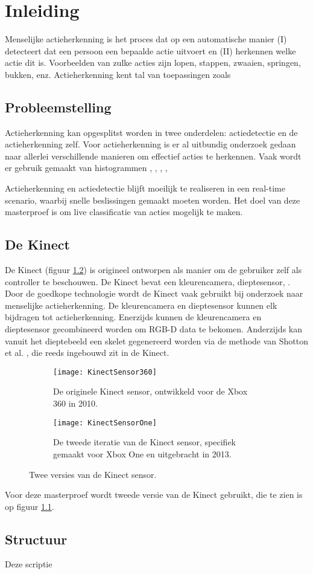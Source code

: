 \setcounter{page}{1}
\chapter{Inleiding}
\label{ch:Inleiding}
Menselijke actieherkenning is het proces dat op een automatische manier (I) detecteert dat een persoon een bepaalde actie uitvoert en (II) herkennen welke actie dit is. Voorbeelden van zulke acties zijn lopen, stappen, zwaaien, springen, bukken, enz. Actieherkenning kent tal van toepassingen zoals 




\section{Probleemstelling}
Actieherkenning kan opgesplitst worden in twee onderdelen: actiedetectie en de actieherkenning zelf. Voor actieherkenning is er al uitbundig onderzoek gedaan naar allerlei verschillende manieren om effectief acties te herkennen. Vaak wordt er gebruik gemaakt van histogrammen \cite{Xia2012},
\cite{Chen2017},
\cite{Vezzani2010},
\cite{Mendoza2007}, 


Actieherkenning en actiedetectie blijft moeilijk te realiseren in een real-time scenario, waarbij snelle beslissingen gemaakt moeten worden. Het doel van deze masterproef is om live classificatie van acties mogelijk te maken. 



\section{De Kinect}
De Kinect (figuur \ref{fig:KinectSensorVersies}) is origineel ontworpen als manier om de gebruiker zelf als controller te beschouwen. De Kinect bevat een kleurencamera, dieptesensor, . Door de goedkope technologie wordt de Kinect vaak gebruikt bij onderzoek naar menselijke actieherkenning. De kleurencamera en dieptesensor kunnen elk bijdragen tot actieherkenning. Enerzijds kunnen de kleurencamera en dieptesensor gecombineerd worden om RGB-D data te bekomen. Anderzijds kan vanuit het dieptebeeld een skelet gegenereerd worden via de methode van Shotton et al. \cite{Shotton2011}, die reeds ingebouwd zit in de Kinect.
\begin{figure}
	\begin{subfigure}[t]{0.48\textwidth}
		\texttt{[image: KinectSensor360]}
		\caption{De originele Kinect sensor, ontwikkeld voor de Xbox 360 in 2010.}
	\end{subfigure}
	\begin{subfigure}[t]{0.48\textwidth}
		\texttt{[image: KinectSensorOne]}
		\caption{De tweede iteratie van de Kinect sensor, specifiek gemaakt voor Xbox One en uitgebracht in 2013.}
		\label{fig:KinectSensorOne}
	\end{subfigure}
	\caption{Twee versies van de Kinect sensor.}
	\label{fig:KinectSensorVersies}
\end{figure}

Voor deze masterproef wordt tweede versie van de Kinect gebruikt, die te zien is op figuur \ref{fig:KinectSensorOne}.


\section{Structuur}
Deze scriptie 
